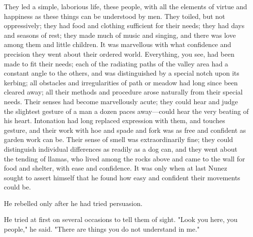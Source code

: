 \documentclass[courier]{sffms}
\begin{document}
They led a simple, laborious life, these people, with all the elements
of virtue and happiness as these things can be understood by men. They
toiled, but not oppressively; they had food and clothing sufficient
for their needs; they had days and seasons of rest; they made much of
music and singing, and there was love among them and little
children. It was marvellous with what confidence and precision they
went about their ordered world. Everything, you see, had been made to
fit their needs; each of the radiating paths of the valley area had a
constant angle to the others, and was distinguished by a special notch
upon its kerbing; all obstacles and irregularities of path or meadow
had long since been cleared away; all their methods and procedure
arose naturally from their special needs. Their senses had become
marvellously acute; they could hear and judge the slightest gesture of
a man a dozen paces away---could hear the very beating of his
heart. Intonation had long replaced expression with them, and touches
gesture, and their work with hoe and spade and fork was as free and
confident as garden work can be. Their sense of smell was
extraordinarily fine; they could distinguish individual differences as
readily as a dog can, and they went about the tending of llamas, who
lived among the rocks above and came to the wall for food and shelter,
with ease and confidence. It was only when at last Nunez sought to
assert himself that he found how easy and confident their movements
could be.

He rebelled only after he had tried persuasion.

He tried at first on several occasions to tell them of sight. "Look
you here, you people," he said. "There are things you do not
understand in me."
\end{document}
